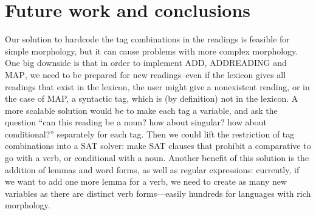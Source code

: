 



\section{Future work and conclusions}
\label{sec:conclusion}

Our solution to hardcode the tag combinations in the readings is feasible for simple morphology, but it can cause problems with more complex morphology. One big downside is that in order to implement \textsc{ADD}, \textsc{ADDREADING} and \textsc{MAP}, we need to be prepared for new readings--even if the lexicon gives all readings that exist in the lexicon, the user might give a nonexistent reading, or in the case of MAP, a syntactic tag, which is (by definition) not in the lexicon. A more scalable solution would be to make each tag a variable, and ask the question ``can this reading be a noun? how about singular? how about conditional?'' separately for each tag. Then we could lift the restriction of tag combinations into a SAT solver: make SAT clauses that prohibit a comparative to go with a verb, or conditional with a noun.
Another benefit of this solution is the addition of lemmas and word forms, as well as regular expressions: currently, if we want to add one more lemma for a verb, we need to create as many new variables as there are distinct verb forms---easily hundreds for languages with rich morphology.


